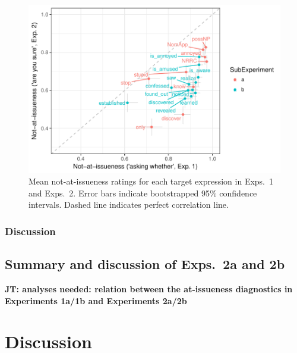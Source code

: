 \documentclass[11pt,fleqn]{article}
\newcommand{\6}{\mbox{$[\hspace*{-.6mm}[$}}
\newcommand{\9}{\mbox{$]\hspace*{-.6mm}]$}}
\newcommand{\jt}[1]{\textbf{\color{blue}JT: #1}}
\begin{document}
\begin{figure}[!h]
\begin{center}

\includegraphics[width=14cm]{../results/ai-meta-analysis/graphs/correlation-bytrigger}

\end{center}
\caption{Mean not-at-issueness ratings for each target expression in Exps.~1 and Exps.~2. Error bars indicate bootstrapped 95\% confidence intervals. Dashed line indicates perfect correlation line.}
\label{fig:ai-correlation}
\end{figure}

\subsubsection{Discussion}

\subsection{Summary and discussion of Exps.~2a and 2b}

\jt{analyses needed: relation between the at-issueness diagnostics in Experiments 1a/1b and Experiments 2a/2b}

\section{Discussion}\label{s5}
\end{document}
